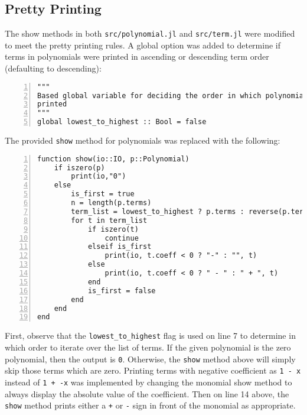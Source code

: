 \documentclass{article}
\theoremstyle{plain}
\numberwithin{theorem}{section}
\numberwithin{example}{section}
\theoremstyle{definition}
\numberwithin{definition}{section}
\begin{document}
\bigbreak

\subsection{Pretty Printing}
The show methods in both \texttt{src/polynomial.jl} and \texttt{src/term.jl}
were modified to meet the pretty printing rules. A global option was added to
determine if terms in polynomials were printed in ascending or descending term
order (defaulting to descending):

\begin{codebox}
    \begin{Verbatim}[numbers=left,xleftmargin=5mm]
"""
Based global variable for deciding the order in which polynomial terms are
printed
"""
global lowest_to_highest :: Bool = false
    \end{Verbatim}
\end{codebox}

The provided \texttt{show} method for polynomials was replaced with the
following:

\begin{codebox}
    \begin{Verbatim}[numbers=left,xleftmargin=5mm]
function show(io::IO, p::Polynomial) 
    if iszero(p)
        print(io,"0")
    else
        is_first = true
        n = length(p.terms)
        term_list = lowest_to_highest ? p.terms : reverse(p.terms)
        for t in term_list
            if iszero(t)
                continue
            elseif is_first
                print(io, t.coeff < 0 ? "-" : "", t)
            else
                print(io, t.coeff < 0 ? " - " : " + ", t)
            end
            is_first = false
        end
    end
end
    \end{Verbatim}
\end{codebox}

First, observe that the \texttt{lowest\_to\_highest} flag is used on line 7 to
determine in which order to iterate over the list of terms. If the given
polynomial is the zero polynomial, then the output is \texttt{0}. Otherwise, the
\texttt{show} method above will simply skip those terms which are zero.
Printing terms with negative coefficient as \texttt{1 - x} instead of
\texttt{1 + -x} was implemented by changing the monomial show method to always
display the absolute value of the coefficient. Then on line 14 above, the
\texttt{show} method prints either a \texttt{+} or \texttt{-} sign in front of
the monomial as appropriate. \medbreak
\end{document}
